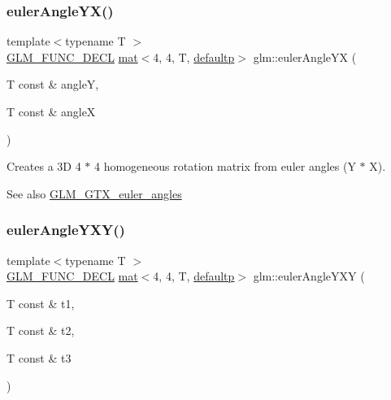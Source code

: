 \subsubsection{\texorpdfstring{euler\+Angle\+Y\+X()}{eulerAngleYX()}}
{\footnotesize\ttfamily template$<$typename T $>$ \\
\mbox{\hyperlink{setup_8hpp_ab2d052de21a70539923e9bcbf6e83a51}{G\+L\+M\+\_\+\+F\+U\+N\+C\+\_\+\+D\+E\+CL}} \mbox{\hyperlink{structglm_1_1mat}{mat}}$<$4, 4, T, \mbox{\hyperlink{namespaceglm_a36ed105b07c7746804d7fdc7cc90ff25a9d21ccd8b5a009ec7eb7677befc3bf51}{defaultp}}$>$ glm\+::euler\+Angle\+YX (\begin{DoxyParamCaption}\item[{T const \&}]{angleY,  }\item[{T const \&}]{angleX }\end{DoxyParamCaption})}

Creates a 3D 4 $\ast$ 4 homogeneous rotation matrix from euler angles (Y $\ast$ X). \begin{DoxySeeAlso}{See also}
\mbox{\hyperlink{group__gtx__euler__angles}{G\+L\+M\+\_\+\+G\+T\+X\+\_\+euler\+\_\+angles}} 
\end{DoxySeeAlso}
\mbox{\label{group__gtx__euler__angles_ga750fba9894117f87bcc529d7349d11de}} 
\subsubsection{\texorpdfstring{euler\+Angle\+Y\+X\+Y()}{eulerAngleYXY()}}
{\footnotesize\ttfamily template$<$typename T $>$ \\
\mbox{\hyperlink{setup_8hpp_ab2d052de21a70539923e9bcbf6e83a51}{G\+L\+M\+\_\+\+F\+U\+N\+C\+\_\+\+D\+E\+CL}} \mbox{\hyperlink{structglm_1_1mat}{mat}}$<$4, 4, T, \mbox{\hyperlink{namespaceglm_a36ed105b07c7746804d7fdc7cc90ff25a9d21ccd8b5a009ec7eb7677befc3bf51}{defaultp}}$>$ glm\+::euler\+Angle\+Y\+XY (\begin{DoxyParamCaption}\item[{T const \&}]{t1,  }\item[{T const \&}]{t2,  }\item[{T const \&}]{t3 }\end{DoxyParamCaption})}


